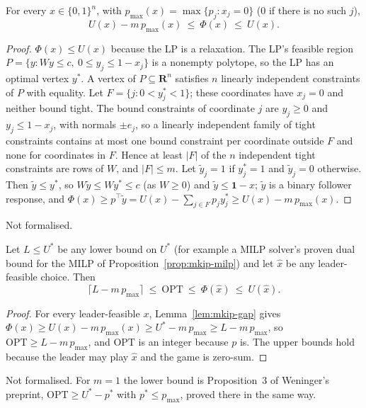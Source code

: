 \begin{lemma}\label{lem:mkip-gap}
For every $x\in\{0,1\}^n$, with $p_{\max}(x)=\max\{p_j: x_j=0\}$ ($0$ if there is
no such $j$),
\[
  U(x)-m\,p_{\max}(x)\ \le\ \Phi(x)\ \le\ U(x).
\]
\end{lemma}
\begin{proof}
$\Phi(x)\le U(x)$ because the LP is a relaxation. The LP's feasible region
$P=\{y: Wy\le c,\ 0\le y_j\le 1-x_j\}$ is a nonempty polytope, so the LP has
an optimal vertex $y^{*}$. A vertex of $P\subseteq\mathbf{R}^n$ satisfies $n$
linearly independent constraints of $P$ with equality. Let
$F=\{j: 0<y^{*}_j<1\}$; these coordinates have $x_j=0$ and neither bound
tight. The bound constraints of coordinate $j$ are $y_j\ge 0$ and
$y_j\le 1-x_j$, with normals $\pm e_j$, so a linearly independent family of
tight constraints contains at most one bound constraint per coordinate
outside $F$ and none for coordinates in $F$. Hence at least $|F|$ of the $n$
independent tight constraints are rows of $W$, and $|F|\le m$. Let
$\tilde y_j=1$ if $y^{*}_j=1$ and $\tilde y_j=0$ otherwise. Then
$\tilde y\le y^{*}$, so $W\tilde y\le Wy^{*}\le c$ (as $W\ge 0$) and
$\tilde y\le\mathbf{1}-x$; $\tilde y$ is a binary follower response, and
$\Phi(x)\ge p^{\top}\tilde y=U(x)-\sum_{j\in F}p_jy^{*}_j\ge U(x)-m\,p_{\max}(x)$.
\end{proof}
\noindent Not formalised.

\begin{theorem}[Bracket]\label{thm:mkip-bracket}
Let $L\le U^{*}$ be any lower bound on $U^{*}$ (for example a MILP solver's
proven dual bound for the MILP of Proposition~\ref{prop:mkip-milp}) and let
$\hat x$ be any leader-feasible choice. Then
\[
  \lceil L-m\,p_{\max}\rceil\ \le\ \mathrm{OPT}\ \le\ \Phi(\hat x)\ \le\ U(\hat x).
\]
\end{theorem}
\begin{proof}
For every leader-feasible $x$, Lemma~\ref{lem:mkip-gap} gives
$\Phi(x)\ge U(x)-m\,p_{\max}(x)\ge U^{*}-m\,p_{\max}\ge L-m\,p_{\max}$, so
$\mathrm{OPT}\ge L-m\,p_{\max}$, and $\mathrm{OPT}$ is an integer because $p$ is.
The upper bounds hold because the leader may play $\hat x$ and the game is
zero-sum.
\end{proof}
\noindent Not formalised. For $m=1$ the lower bound is Proposition~3 of
Weninger's preprint, $\mathrm{OPT}\ge U^{*}-p^{*}$ with $p^{*}\le p_{\max}$, proved
there in the same way.\cite{weninger2026approx}


